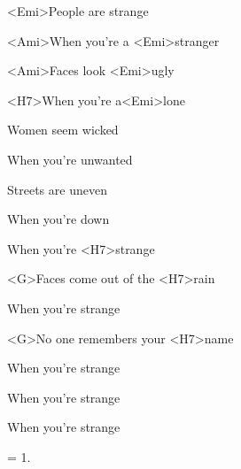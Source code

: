 

\zs
<Emi>People are strange

<Ami>When you're a <Emi>stranger

<Ami>Faces look <Emi>ugly

<H7>When you're a<Emi>lone

\bigskip

Women seem wicked

When you're unwanted

Streets are uneven

When you're down
\ks

\zr
When you're <H7>strange

<G>Faces come out of the <H7>rain

When you're strange

<G>No one remembers your <H7>name

When you're strange

When you're strange

When you're strange
\kr

\zs
= 1.
\ks

\zr\kr

\kp
